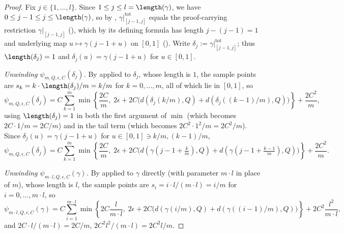 \begin{proof}
  Fix $j \in \{1,\dotsc,l\}$. Since $1 \le j \le l = \length(\gamma)$, we have
  $0 \le j-1 \le j \le \length(\gamma)$, so by ,
  $\gamma|^{\mathrm{tot}}_{[j-1,j]}$ equals the proof-carrying restriction $\gamma|_{[j-1,j]}$
  (), which by its defining formula has length $j-(j-1)=1$ and underlying
  map $u \mapsto \gamma(j-1+u)$ on $[0,1]$ (). Write $\delta_j :=
  \gamma|^{\mathrm{tot}}_{[j-1,j]}$; thus $\length(\delta_j) = 1$ and $\delta_j(u) = \gamma(j-1+u)$
  for $u \in [0,1]$.

  \emph{Unwinding $\psi_{m,Q,\epsilon,C}(\delta_j)$.} By  applied to $\delta_j$, whose
  length is $1$, the sample points are $s_k = k \cdot \length(\delta_j)/m = k/m$ for
  $k=0,\dotsc,m$, all of which lie in $[0,1]$, so
  \[
    \psi_{m,Q,\epsilon,C}(\delta_j) = C \sum_{k=1}^m \min\left\{\frac{2C}{m}, \; 2\epsilon +
      2C\bigl(d(\delta_j(k/m),Q) + d(\delta_j((k-1)/m),Q)\bigr)\right\} + \frac{2C^2}{m}
    ,
  \]
  using $\length(\delta_j)=1$ in both the first argument of $\min$ (which becomes
  $2C\cdot 1/m = 2C/m$) and in the tail term (which becomes $2C^2\cdot 1^2/m = 2C^2/m$). Since
  $\delta_j(u) = \gamma(j-1+u)$ for $u \in [0,1] \ni k/m,(k-1)/m$,
  \[
    \psi_{m,Q,\epsilon,C}(\delta_j) = C \sum_{k=1}^m \min\left\{\frac{2C}{m}, \; 2\epsilon +
      2C\bigl(d(\gamma(j-1+\tfrac{k}{m}),Q) + d(\gamma(j-1+\tfrac{k-1}{m}),Q)\bigr)\right\}
      + \frac{2C^2}{m}
    .
  \]

  \emph{Unwinding $\psi_{m\cdot l,Q,\epsilon,C}(\gamma)$.} By  applied to $\gamma$
  directly (with parameter $m\cdot l$ in place of $m$), whose length is $l$, the sample points are
  $s_i = i\cdot l/(m\cdot l) = i/m$ for $i=0,\dotsc,m\cdot l$, so
  \[
    \psi_{m\cdot l,Q,\epsilon,C}(\gamma) = C \sum_{i=1}^{m\cdot l} \min\left\{2C \frac{l}{m\cdot
      l}, \; 2\epsilon + 2C\bigl(d(\gamma(i/m),Q) + d(\gamma((i-1)/m),Q)\bigr)\right\}
      + 2C^2 \frac{l^2}{m\cdot l}
    ,
  \]
  and $2C\cdot l/(m\cdot l) = 2C/m$, $2C^2 l^2/(m\cdot l) = 2C^2 l/m$.


\end{proof}
